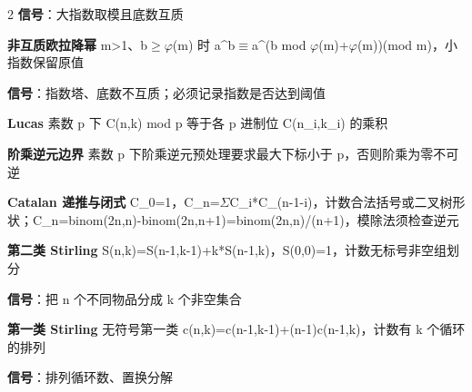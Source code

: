 \documentclass[UTF8,fontset=fandol,a4paper,twoside]{ctexart}
\begin{document}
\begin{multicols}{2}
\textbf{信号}：大指数取模且底数互质\par
\par\textbf{非互质欧拉降幂}\quad
m>\allowbreak{}1、b\ensuremath{\ge}\ensuremath{\varphi}(\allowbreak{}m)\allowbreak{} 时 a\textasciicircum{}b\ensuremath{\equiv}a\textasciicircum{}(\allowbreak{}b mod \ensuremath{\varphi}(\allowbreak{}m)\allowbreak{}+\allowbreak{}\ensuremath{\varphi}(\allowbreak{}m)\allowbreak{})\allowbreak{}(\allowbreak{}mod m)\allowbreak{}，小指数保留原值\par
\textbf{信号}：指数塔、底数不互质；必须记录指数是否达到阈值\par
\par\textbf{Lucas}\quad
素数 p 下 C(\allowbreak{}n,\allowbreak{}k)\allowbreak{} mod p 等于各 p 进制位 C(\allowbreak{}n\_i,\allowbreak{}k\_i)\allowbreak{} 的乘积\par
\par\textbf{阶乘逆元边界}\quad
素数 p 下阶乘逆元预处理要求最大下标小于 p，否则阶乘为零不可逆\par
\par\textbf{Catalan 递推与闭式}\quad
C\_0=\allowbreak{}1，C\_n=\allowbreak{}\ensuremath{\Sigma}C\_i*C\_(\allowbreak{}n-\allowbreak{}1-\allowbreak{}i)\allowbreak{}，计数合法括号或二叉树形状；C\_n=\allowbreak{}binom(\allowbreak{}2n,\allowbreak{}n)\allowbreak{}-\allowbreak{}binom(\allowbreak{}2n,\allowbreak{}n+\allowbreak{}1)\allowbreak{}=\allowbreak{}binom(\allowbreak{}2n,\allowbreak{}n)\allowbreak{}/\allowbreak{}(\allowbreak{}n+\allowbreak{}1)\allowbreak{}，模除法须检查逆元\par
\par\textbf{第二类 Stirling}\quad
S(\allowbreak{}n,\allowbreak{}k)\allowbreak{}=\allowbreak{}S(\allowbreak{}n-\allowbreak{}1,\allowbreak{}k-\allowbreak{}1)\allowbreak{}+\allowbreak{}k*S(\allowbreak{}n-\allowbreak{}1,\allowbreak{}k)\allowbreak{}，S(\allowbreak{}0,\allowbreak{}0)\allowbreak{}=\allowbreak{}1，计数无标号非空组划分\par
\textbf{信号}：把 n 个不同物品分成 k 个非空集合\par
\par\textbf{第一类 Stirling}\quad
无符号第一类 c(\allowbreak{}n,\allowbreak{}k)\allowbreak{}=\allowbreak{}c(\allowbreak{}n-\allowbreak{}1,\allowbreak{}k-\allowbreak{}1)\allowbreak{}+\allowbreak{}(\allowbreak{}n-\allowbreak{}1)\allowbreak{}c(\allowbreak{}n-\allowbreak{}1,\allowbreak{}k)\allowbreak{}，计数有 k 个循环的排列\par
\textbf{信号}：排列循环数、置换分解\par

\end{multicols}
\end{document}
